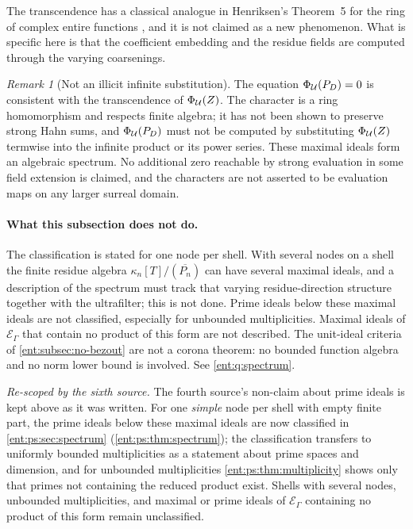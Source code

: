 \documentclass[11pt]{article}
\theoremstyle{plain}
\theoremstyle{plain}
\theoremstyle{plain}
\theoremstyle{definition}
\theoremstyle{definition}
\theoremstyle{definition}
\theoremstyle{definition}
\theoremstyle{remark}
\newtheorem{remark}[remark]{Remark}
\newcommand{\E}{\mathcal E_\Gamma}
\begin{document}
The transcendence has a classical analogue in Henriksen's Theorem~5 for the
ring of complex entire functions \cite{Henriksen}, and it is not claimed as a
new phenomenon. What is specific here is that the coefficient embedding and
the residue fields are computed through the varying coarsenings.

\begin{remark}[Not an illicit infinite substitution]
\label{ent:sm:rem:no-substitution}
The equation $\Phi_\mathcal U(P_D)=0$ is consistent with the transcendence of
$\Phi_\mathcal U(Z)$. The character is a ring homomorphism and respects finite
algebra; it has not been shown to preserve strong Hahn sums, and
$\Phi_\mathcal U(P_D)$ must not be computed by substituting $\Phi_\mathcal U(Z)$
termwise into the infinite product or its power series. These maximal ideals
form an algebraic spectrum. No additional zero reachable by strong
evaluation in some field extension is claimed, and the characters are not
asserted to be evaluation maps on any larger surreal domain.
\end{remark}

\paragraph{What this subsection does not do.}
The classification is stated for one node per shell. With several nodes on a
shell the finite residue algebra $\kappa_n[T]/(\overline{P_n})$ can have
several maximal ideals, and a description of the spectrum must track that
varying residue-direction structure together with the ultrafilter; this is
not done. Prime ideals below these maximal ideals are not classified,
especially for unbounded multiplicities. Maximal ideals of $\E$ that contain
no product of this form are not described. The unit-ideal criteria of
\cref{ent:subsec:no-bezout} are not a corona theorem: no bounded function
algebra and no norm lower bound is involved. See \cref{ent:q:spectrum}.

\emph{Re-scoped by the sixth source.} The fourth source's non-claim about
prime ideals is kept above as it was written. For one \emph{simple} node per
shell with empty finite part, the prime ideals below these maximal ideals are
now classified in \cref{ent:ps:sec:spectrum}
(\cref{ent:ps:thm:spectrum}); the classification transfers to uniformly
bounded multiplicities as a statement about prime spaces and dimension, and
for unbounded multiplicities \cref{ent:ps:thm:multiplicity} shows only that
primes not containing the reduced product exist. Shells with several nodes,
unbounded multiplicities, and maximal or prime ideals of $\E$ containing no
product of this form remain unclassified.
\end{document}
